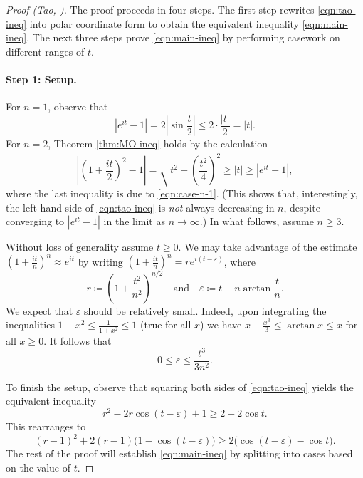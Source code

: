 \documentclass[11pt]{article}
\theoremstyle{definition}
\newcommand{\abs}[1]{\left|#1\right|}
\newcommand{\eps}{\varepsilon}
\begin{document}
\begin{proof}[Proof (Tao, \cite{tao-MO})]
	The proof proceeds in four steps.  The first step rewrites \eqref{eqn:tao-ineq} into polar coordinate form to obtain the equivalent inequality \eqref{eqn:main-ineq}.  The next three steps prove \eqref{eqn:main-ineq} by performing casework on different ranges of $t$.
	
	\paragraph{\textbf{Step 1: Setup.}} For $n = 1$, observe that 
	\begin{equation}\label{eqn:case-n-1}
		|e^{it} - 1| = 2\left|\sin \frac t2\right| \leq 2\cdot \frac {|t|}2 = |t|.
	\end{equation}
	For $n = 2$, Theorem \ref{thm:MO-ineq} holds by the calculation
	\[
	\abs{\left(1 + \frac{it}2\right)^2 - 1} = \sqrt{t^2 + \left(\frac{t^2}4\right)^2} \geq |t|\geq |e^{it} - 1|,
	\]
	where the last inequality is due to \eqref{eqn:case-n-1}.  (This shows that, interestingly, the left hand side of \eqref{eqn:tao-ineq} is \textit{not} always decreasing in $n$, despite converging to $|e^{it} - 1|$ in the limit as $n\to\infty$.) In what follows, assume $n\geq 3$.
	
	\par Without loss of generality assume $t\geq 0$.  We may take advantage of the estimate $(1 + \tfrac{it}{n})^n\approx e^{it}$ by writing $(1+\tfrac{it}n)^n = re^{i(t-\eps)}$, where 
	\[
	r\coloneqq \left(1 + \frac{t^2}{n^2}\right)^{n/2}\quad\text{and}\quad \eps \coloneqq t - n\arctan \frac tn.
	\]
	We expect that $\eps$ should be relatively small.  Indeed, upon integrating the inequalities $1-x^2 \leq \tfrac{1}{1+x^2}\leq 1$ (true for all $x$) we have
	$x - \frac{x^3}3 \leq \arctan x \leq x$ for all $x\geq 0$.  It follows that
	\begin{equation}\label{eqn:bound-eps}
		0\leq \eps \leq \frac{t^3}{3n^2}.
	\end{equation}
	
	\par To finish the setup, observe that squaring both sides of \eqref{eqn:tao-ineq} yields the equivalent inequality
	\[
	r^2 - 2r\cos(t - \eps) + 1 \geq 2 - 2\cos t.
	\]
	This rearranges to 
	\begin{equation}\label{eqn:main-ineq}
		(r-1)^2 + 2(r-1)\Big(1 - \cos(t-\eps)\Big) \geq 2\Big(\cos(t-\eps) - \cos t\Big).
	\end{equation}
	The rest of the proof will establish \eqref{eqn:main-ineq} by splitting into cases based on the value of $t$.
	

\end{proof}
\end{document}
